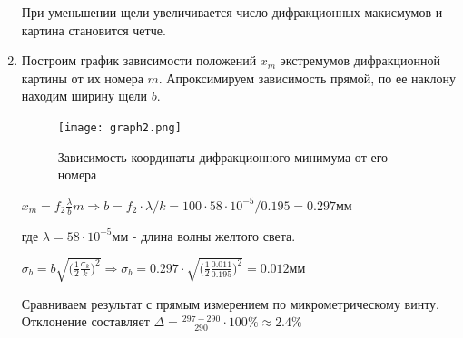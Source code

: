 \documentclass[a4paper,12pt]{article}
\begin{document}
\begin{enumerate}
    При уменьшении щели увеличивается число дифракционных макисмумов и картина становится четче.
    \item Построим график зависимости положений $x_m$ экстремумов дифракционной картины от их номера $m$. Апроксимируем зависимость прямой, по ее наклону находим ширину щели $b$.

    \begin{figure}[h]
    \centering
    \texttt{[image: graph2.png]}
    \caption{Зависимость координаты дифракционного минимума от его номера}
    \label{g2}
    \end{figure}

    $x_m = f_2\frac{\lambda}{b}m\Longrightarrow b = f_2\cdot\lambda/k = 100 \cdot 58\cdot10^{-5} / 0.195=0.297\text{мм}$

    где $\lambda = 58\cdot10^{-5}\text{мм}$ - длина волны желтого света.

    $\sigma_b = b\sqrt{\Big(\frac{1}{2}\frac{\sigma_k}{k}\Big)^2} \Longrightarrow \sigma_b = 0.297\cdot\sqrt{\Big(\frac{1}{2}\frac{0.011}{0.195}\Big)^2}=0.012\text{мм}$
    \begin{center}
    \end{center}
    
    Сравниваем результат с прямым измерением по микрометрическому винту. Отклонение составляет $\Delta=\frac{297-290}{290}\cdot100\%\approx2.4\%$
\end{enumerate}
\end{document}
